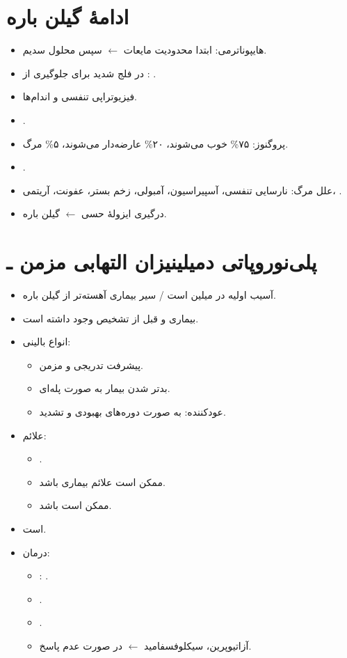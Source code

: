 \documentclass[a4paper,12pt]{extbook}
\begin{document}
\section*{ادامهٔ گیلن باره}
\begin{itemize}
\item هایپوناترمی: ابتدا محدودیت مایعات $\longleftarrow$ سپس محلول سدیم.
\item در فلج شدید برای جلوگیری از : .
\item فیزیوتراپی تنفسی و اندام‌ها.
\item {}.
\item پروگنوز: ۷۵\% خوب می‌شوند، ۲۰\% عارضه‌دار می‌شوند، ۵\% مرگ.
\item {}.
\item علل مرگ: نارسایی تنفسی، آسپیراسیون، آمبولی، زخم بستر، عفونت، آریتمی، .
\item درگیری ایزولهٔ حسی $\longleftarrow$  گیلن باره.
\end{itemize}
\section*{پلی‌نوروپاتی دمیلینیزان التهابی مزمن ـ }
\begin{itemize}
\item آسیب اولیه در میلین است / سیر بیماری آهسته‌تر از گیلن باره.
\item بیماری  و  قبل از تشخیص وجود داشته است.
\item انواع بالینی:
\begin{itemize}
\item پیشرفت تدریجی و مزمن.
\item بدتر شدن بیمار به صورت پله‌ای.
\item عودکننده: به صورت دوره‌های بهبودی و تشدید.
\end{itemize}
\item علائم:
\begin{itemize}
\item {}.
\item ممکن است علائم بیماری  باشد.
\item ممکن است  باشد.
\end{itemize}
\item {} است.
\item درمان:
\begin{itemize}
\item {}: .
\item {}.
\item {}.
\item آزاتیوپرین، سیکلوفسفامید $\longleftarrow$ در صورت عدم پاسخ.
\end{itemize}
\end{itemize}
\end{document}
